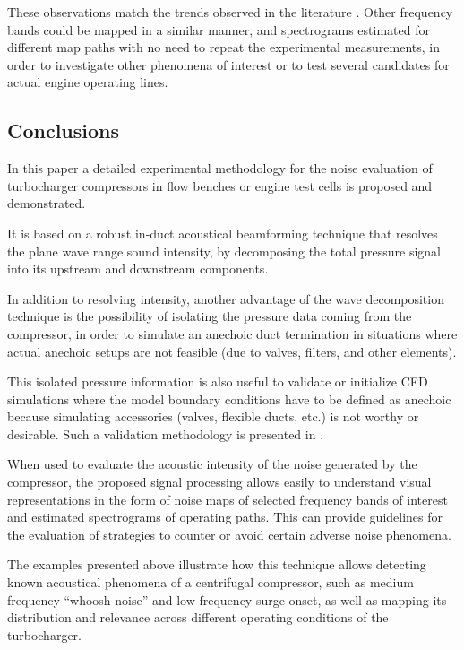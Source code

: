 These observations match the trends observed in the literature \cite{evans2005minimizing,evans2006reduction,sevginer2007investigation}. Other frequency bands could be mapped in a similar manner, and spectrograms estimated for different map paths with no need to repeat the experimental measurements, in order to investigate other phenomena of interest or to test several candidates for actual engine operating lines.

\subsection{Conclusions}
\label{sec:conclusions}

In this paper a detailed experimental methodology for the noise evaluation of turbocharger compressors in flow benches \cite{broatch2015simulations} or engine test cells \cite{torregrosa2014aco} is proposed and demonstrated.

It is based on a robust in-duct acoustical beamforming technique that resolves the plane wave range sound intensity, by decomposing the total pressure signal into its upstream and downstream components.

In addition to resolving intensity, another advantage of the wave decomposition technique is the possibility of isolating the pressure data coming from the compressor, in order to simulate an anechoic duct termination in situations where actual anechoic setups are not feasible (due to valves, filters, and other elements).

This isolated pressure information is also useful to validate or initialize CFD simulations where the model boundary conditions have to be defined as anechoic because simulating accessories (valves, flexible ducts, etc.) is not worthy or desirable. Such a validation methodology is presented in \cite{broatch2014methodology}.

When used to evaluate the acoustic intensity of the noise generated by the compressor, the proposed signal processing allows easily to understand visual representations in the form of noise maps of selected frequency bands of interest and estimated spectrograms of operating paths. This can provide guidelines for the evaluation of strategies to counter or avoid certain adverse noise phenomena.

The examples presented above illustrate how this technique allows detecting known acoustical phenomena of a  centrifugal compressor, such as medium frequency ``whoosh noise'' and low frequency surge onset, as well as mapping its distribution and relevance across different operating conditions of the turbocharger.

